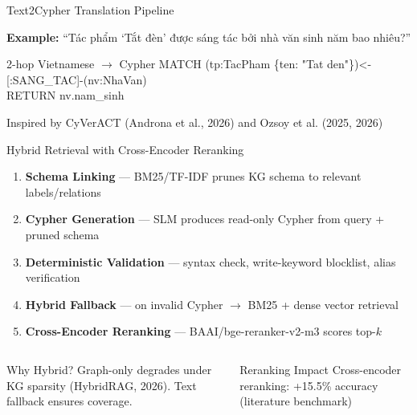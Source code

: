 \documentclass[aspectratio=169]{beamer}
\newcommand{\pos}[1]{\textcolor{positive}{#1}}
\begin{document}
\begin{frame}{Text2Cypher Translation Pipeline}
\begin{center}
\end{center}
\vspace{0.3em}
\vspace{0.3em}
\textbf{Example:} ``Tác phẩm `Tắt đèn' được sáng tác bởi nhà văn sinh năm bao nhiêu?''
\begin{exampleblock}{2-hop Vietnamese $\rightarrow$ Cypher}
{\ttfamily\small MATCH (tp:TacPham \{ten: "Tat den"\})<-[:SANG\_TAC]-(nv:NhaVan)\\
RETURN nv.nam\_sinh}
\end{exampleblock}
\small Inspired by CyVerACT (Androna et al., 2026) and Ozsoy et al. (2025, 2026)
\end{frame}

\begin{frame}{Hybrid Retrieval with Cross-Encoder Reranking}
\begin{enumerate}
  \item \textbf{Schema Linking} --- BM25/TF-IDF prunes KG schema to relevant labels/relations
  \item \textbf{Cypher Generation} --- SLM produces read-only Cypher from query + pruned schema
  \item \textbf{Deterministic Validation} --- syntax check, write-keyword blocklist, alias verification
  \item \textbf{Hybrid Fallback} --- on invalid Cypher $\rightarrow$ BM25 + dense vector retrieval
  \item \textbf{Cross-Encoder Reranking} --- BAAI/bge-reranker-v2-m3 scores top-$k$
\end{enumerate}
\vspace{0.5em}
\begin{columns}[T]
\begin{alertblock}{Why Hybrid?}
Graph-only degrades under KG sparsity (HybridRAG, 2026). Text fallback ensures coverage.
\end{alertblock}
\begin{exampleblock}{Reranking Impact}
Cross-encoder reranking: \pos{+15.5\%} accuracy (literature benchmark)
\end{exampleblock}
\end{columns}
\end{frame}
\end{document}
